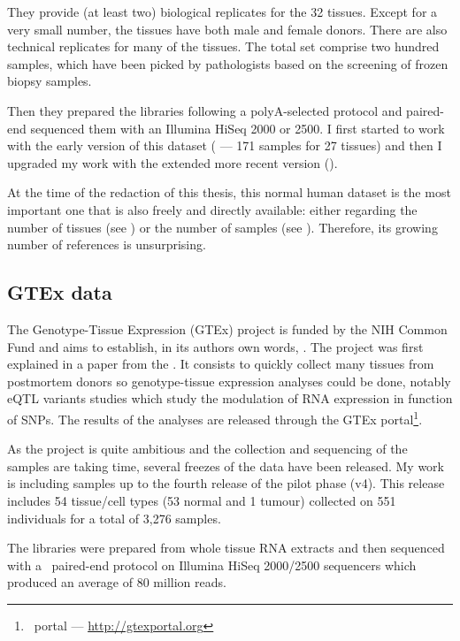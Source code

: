 They provide (at least two) biological replicates for the 32 tissues.
Except for a very small number, the tissues have both male and female donors.
There are also technical replicates for many of the tissues. The total set
comprise two hundred samples, which have been picked by pathologists based on the
screening of frozen biopsy samples.

Then they prepared the libraries following a polyA-selected protocol and
paired-end sequenced them with an Illumina HiSeq 2000 or 2500. I first started
to work with the early version of this dataset
( --- 171 samples for 27 tissues)
and then I upgraded my work with the extended more recent version
().

At the time of the redaction of this thesis, this normal human dataset is the
most important one that is also freely and directly available: either regarding
the number of tissues (see )
or the number of samples (see ). Therefore, its growing
number of references is unsurprising.


\subsection{GTEx data}
\label{subsec:gtexPresentation}
The Genotype-Tissue Expression (\gls{GTEx}) project is funded by the \gls{NIH}
Common Fund and aims to establish, in its authors own words,
. The project was first
explained in a paper from the \cite{GTEx2013}. It consists to quickly collect
many tissues from postmortem donors so genotype-tissue expression analyses could
be done, notably \gls{eQTL} variants studies which study the modulation
of \gls{RNA} expression in function of \glspl{SNP}. The results of the
analyses are released through the GTEx portal\footnote{\Gtex\ portal --- %
\href{http://gtexportal.org}{http://gtexportal.org}}.

As the project is quite ambitious and the collection and sequencing of the samples
are taking time, several freezes of the data have been released. My work is
including samples up to the fourth release of the pilot phase (v4). This
release includes 54 tissue/cell types (53 normal and 1 tumour)
collected on 551 individuals for a total of 3,276 samples.

The libraries were prepared from whole tissue \gls{RNA} extracts and then
sequenced with a \mRNA\ paired-end protocol on Illumina HiSeq 2000/2500
sequencers which produced an average of 80 million reads.

